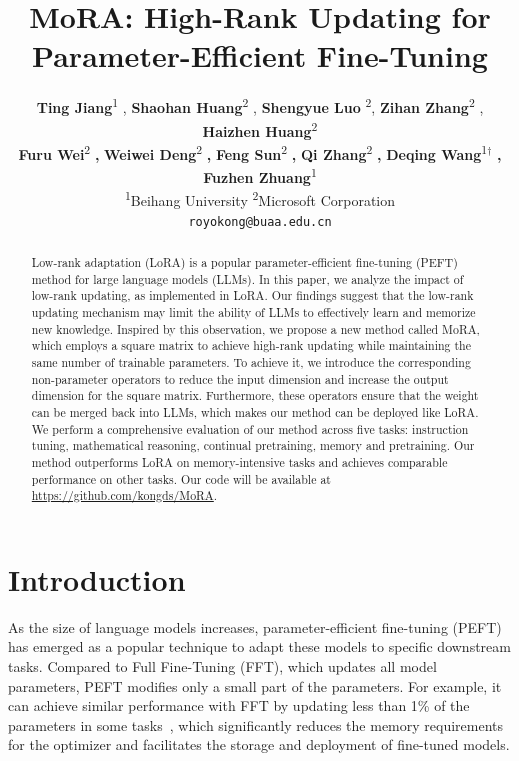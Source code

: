 \documentclass[11pt]{article}
\title{MoRA: High-Rank Updating for Parameter-Efficient Fine-Tuning}
\author{
\textbf{Ting Jiang}\textsuperscript{\rm 1} , \textbf{Shaohan Huang}\textsuperscript{\rm 2} , \textbf{Shengyue Luo} \textsuperscript{\rm 2}, \textbf{Zihan Zhang}\textsuperscript{\rm 2} , \textbf{Haizhen Huang}\textsuperscript{\rm 2}\\
\textbf{Furu Wei}\textsuperscript{\rm 2} \textbf{,} \textbf{Weiwei Deng}\textsuperscript{\rm 2} \textbf{,} \textbf{Feng Sun}\textsuperscript{\rm 2} \textbf{,} \textbf{Qi Zhang}\textsuperscript{\rm 2} \textbf{,} \textbf{Deqing Wang}\textsuperscript{\rm 1}$^\dagger$ \textbf{,} \textbf{Fuzhen Zhuang}\textsuperscript{\rm 1} \\
\textsuperscript{\rm 1}Beihang University \textsuperscript{\rm 2}Microsoft Corporation\\
\texttt{royokong@buaa.edu.cn}\\
}
\begin{document}
\maketitle
\begin{abstract}

Low-rank adaptation (LoRA) is a popular parameter-efficient fine-tuning (PEFT) method for large language models (LLMs).
In this paper, we analyze the impact of low-rank updating, as implemented in LoRA. Our findings suggest that the low-rank updating mechanism may limit the ability of LLMs to effectively learn and memorize new knowledge.
Inspired by this observation, we propose a new method called MoRA, which employs a square matrix to achieve high-rank updating while maintaining the same number of trainable parameters.
To achieve it,
we introduce the corresponding non-parameter operators to reduce the input dimension and increase the output dimension for the square matrix.
Furthermore, these operators ensure that the weight can be merged back into LLMs, which makes our method can be deployed like LoRA.
We perform a comprehensive evaluation of our method across five tasks: instruction tuning, mathematical reasoning, continual pretraining, memory and pretraining. Our method outperforms LoRA on memory-intensive tasks and achieves comparable performance on other tasks.
Our code will be available at \url{https://github.com/kongds/MoRA}.
\end{abstract}

\section{Introduction}

As the size of language models increases, parameter-efficient fine-tuning (PEFT)~\cite{houlsby2019parameter} has emerged as a popular technique to adapt these models to specific downstream tasks.
Compared to Full Fine-Tuning (FFT), which updates all model parameters, PEFT modifies only a small part of the parameters. For example, it can achieve similar performance with FFT by updating less than 1\% of the parameters in some tasks~\cite{hu2021lora}, which significantly reduces the memory requirements for the optimizer and facilitates the storage and deployment of fine-tuned models.
\end{document}
